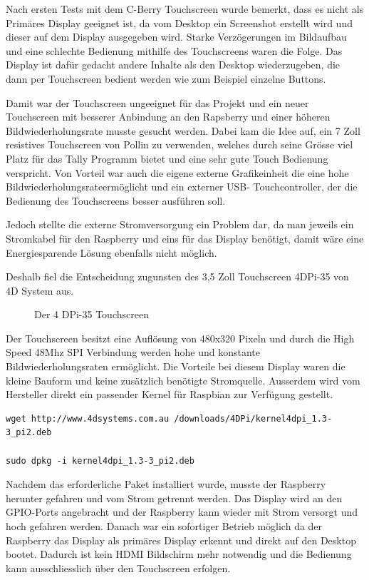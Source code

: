 \documentclass[11pt,a4paper]{article} %
\begin{document}
Nach ersten Tests mit dem C-Berry Touchscreen wurde bemerkt, dass es nicht als Primäres Display geeignet ist, da vom Desktop ein Screenshot erstellt wird und dieser auf dem Display ausgegeben wird. Starke Verzögerungen im Bildaufbau und eine schlechte Bedienung mithilfe des Touchscreens waren die Folge. Das Display ist dafür gedacht andere Inhalte als den Desktop wiederzugeben, die dann per Touchscreen bedient werden wie zum Beispiel einzelne Buttons.
\par
Damit war der Touchscreen ungeeignet für das Projekt und ein neuer Touchscreen mit besserer Anbindung an den Rapsberry und einer höheren Bildwiederholungsrate musste gesucht werden. Dabei kam die Idee auf, ein 7 Zoll resistives Touchscreen von Pollin \cite{6} zu verwenden, welches durch seine Grösse viel Platz für das Tally Programm bietet und eine sehr gute Touch Bedienung verspricht. Von Vorteil war auch die eigene externe Grafikeinheit die eine hohe Bildwiederholungsrateermöglicht  und ein externer USB- Touchcontroller, der die Bedienung des Touchscreens besser ausführen soll.
\par
Jedoch stellte die externe Stromversorgung ein Problem dar, da man jeweils ein Stromkabel für den Raspberry und eins für das Display benötigt, damit wäre eine Energiesparende Lösung ebenfalls nicht möglich.
\par
Deshalb fiel die Entscheidung zugunsten des 3,5 Zoll Touchscreen 4DPi-35 von 4D System aus.\cite{7} 
\begin{figure}[h]
	\caption{Der 4 DPi-35 Touchscreen}
	\end{figure}
Der Touchscreen besitzt eine Auflösung von 480x320 Pixeln und durch die High Speed 48Mhz SPI Verbindung werden hohe und konstante Bildwiederholungsraten ermöglicht.
\newpage
Die Vorteile bei diesem Display waren die kleine Bauform und keine zusätzlich benötigte Stromquelle. Ausserdem wird vom Hersteller direkt ein passender Kernel für Raspbian zur Verfügung gestellt.
\begin{frame}

\begin{lstlisting}
wget http://www.4dsystems.com.au /downloads/4DPi/kernel4dpi_1.3-3_pi2.deb 

sudo dpkg -i kernel4dpi_1.3-3_pi2.deb
\end{lstlisting}

\end{frame}

 Nachdem das erforderliche Paket installiert wurde, musste der Raspberry herunter gefahren und vom Strom getrennt werden. Das Display wird an den GPIO-Ports angebracht und der Raspberry kann wieder mit Strom versorgt und hoch gefahren werden. Danach war ein sofortiger Betrieb möglich da der Raspberry das Display als primäres Display erkennt und direkt auf den Desktop bootet. Dadurch ist kein HDMI Bildschirm mehr notwendig und die Bedienung kann ausschliesslich über den Touchscreen erfolgen.
\par
\end{document}

